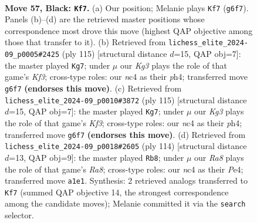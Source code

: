 \documentclass[11pt]{article}
\begin{document}
\clearpage

\begin{figure}[p]\centering
\begin{subfigure}{0.46\textwidth}\centering
\resizebox{\linewidth}{!}{%
\newchessgame
\chessboard[
  setfen={1R6/6p1/5pk1/7p/2NP3P/6P1/7K/r7 b - - 8 57},
  showmover=false,
  pgfstyle=straightmove, color=movearrow, markmove={g6-f7}
]}
\caption{}
\end{subfigure}\hfill
\begin{subfigure}{0.46\textwidth}\centering
\resizebox{\linewidth}{!}{%
\newchessgame
\chessboard[
  setfen={8/5p2/5kp1/7p/4P2P/5P2/1R4PK/r7 b - - 13 58},
  showmover=false,
  pgfstyle=straightmove, color=movearrow, markmove={f6-g7}
]}
\caption{}
\end{subfigure}
\\[4pt]
\begin{subfigure}{0.46\textwidth}\centering
\resizebox{\linewidth}{!}{%
\newchessgame
\chessboard[
  setfen={8/5p2/5kp1/7p/4P2P/5P2/2R3PK/1r6 b - - 2 58},
  showmover=false,
  pgfstyle=straightmove, color=movearrow, markmove={f6-g7}
]}
\caption{}
\end{subfigure}\hfill
\begin{subfigure}{0.46\textwidth}\centering
\resizebox{\linewidth}{!}{%
\newchessgame
\chessboard[
  setfen={R7/5pk1/6p1/7p/4P2P/5PK1/6P1/2r5 w - - 37 58},
  showmover=false,
  pgfstyle=straightmove, color=movearrow, markmove={a8-b8}
]}
\caption{}
\end{subfigure}
\caption{\textbf{Move 57, Black: \texttt{Kf7}.} (a) Our position; Melanie plays \texttt{Kf7} (\texttt{g6f7}). Panels (b)--(d) are the retrieved master positions whose correspondence most drove this move (highest QAP objective among those that transfer to it). (b) Retrieved from \texttt{lichess\_elite\_2024-09\_p0005\#2425} (ply 115) [structural distance $d$=15, QAP obj=7]: the master played \texttt{Kg7}; under $\mu$ our \emph{Kg3} plays the role of that game's \emph{Kf3}; cross-type roles: our \emph{n}c4 as their \emph{p}h4; transferred move \texttt{g6f7} \textbf{(endorses this move)}. (c) Retrieved from \texttt{lichess\_elite\_2024-09\_p0010\#3872} (ply 115) [structural distance $d$=15, QAP obj=7]: the master played \texttt{Kg7}; under $\mu$ our \emph{Kg3} plays the role of that game's \emph{Kf3}; cross-type roles: our \emph{n}c4 as their \emph{p}h4; transferred move \texttt{g6f7} \textbf{(endorses this move)}. (d) Retrieved from \texttt{lichess\_elite\_2024-09\_p0018\#2605} (ply 114) [structural distance $d$=13, QAP obj=9]: the master played \texttt{Rb8}; under $\mu$ our \emph{Ra8} plays the role of that game's \emph{Ra8}; cross-type roles: our \emph{n}c4 as their \emph{P}e4; transferred move \texttt{a1e1}. Synthesis: 2 retrieved analogs transferred to \texttt{Kf7} (summed QAP objective 14, the strongest correspondence among the candidate moves); Melanie committed it via the \texttt{search} selector.}
\label{fig:thought-m113}
\end{figure}
\end{document}
